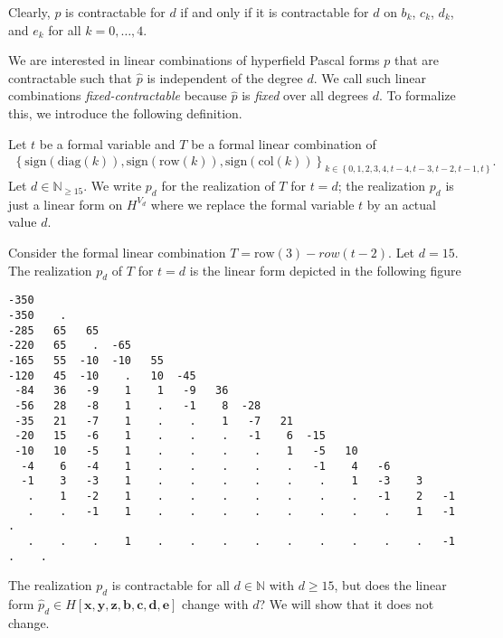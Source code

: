 \begin{remark}
    Clearly, \( p \) is contractable for \( d \) if and only if it is contractable for \( d \) on \( b_k \), \( c_k \), \( d_k \), and \( e_k \) for all \( k = 0, \dots, 4 \).
\end{remark}

We are interested in linear combinations of hyperfield Pascal forms \( p \) that are contractable such that \( \hat p \) is independent of the degree \( d \). We call such linear combinations \emph{fixed-contractable} because \( \hat p \) is \emph{fixed} over all degrees \( d \). To formalize this, we introduce the following definition.

\begin{definition}
    Let \( t \) be a formal variable and \( T \) be a formal linear combination of
    \begin{align*}
        \left\{ \mathrm{sign}(\mathrm{diag}(k)), \mathrm{sign}(\mathrm{row}(k)), \mathrm{sign}(\mathrm{col}(k)) \right\}_{k \in \left\{ 0,1,2,3,4,t-4,t-3,t-2,t-1,t \right\}}.
    \end{align*}
    Let \( d \in \mathbb{N}_{\geq 15}\). We write \( p_d \) for the realization of \( T \) for \( t = d \); the realization \( p_d \) is just a linear form on \( H^{V_d} \) where we replace the formal variable \( t \) by an actual value \( d \).
\end{definition}

\begin{example}
    Consider the formal linear combination \( T = \mathrm{row}(3) - row(t - 2) \). Let \( d = 15 \). The realization \( p_d \) of \( T \) for \( t = d \) is the linear form depicted in the following figure
    \begin{verbatim}
-350 
-350    . 
-285   65   65 
-220   65    .  -65 
-165   55  -10  -10   55 
-120   45  -10    .   10  -45 
 -84   36   -9    1    1   -9   36 
 -56   28   -8    1    .   -1    8  -28 
 -35   21   -7    1    .    .    1   -7   21 
 -20   15   -6    1    .    .    .   -1    6  -15 
 -10   10   -5    1    .    .    .    .    1   -5   10 
  -4    6   -4    1    .    .    .    .    .   -1    4   -6 
  -1    3   -3    1    .    .    .    .    .    .    1   -3    3 
   .    1   -2    1    .    .    .    .    .    .    .   -1    2   -1 
   .    .   -1    1    .    .    .    .    .    .    .    .    1   -1    . 
   .    .    .    1    .    .    .    .    .    .    .    .    .   -1    .    .         
    \end{verbatim}
    The realization \( p_d \) is contractable for all \( d \in \mathbb{N} \) with \( d \geq 15 \), but does the linear form \( \hat p_d \in H[\mathbf{x}, \mathbf{y}, \mathbf{z}, \mathbf{b}, \mathbf{c}, \mathbf{d}, \mathbf{e}]\) change with \( d \)? We will show that it does not change.
\end{example}

